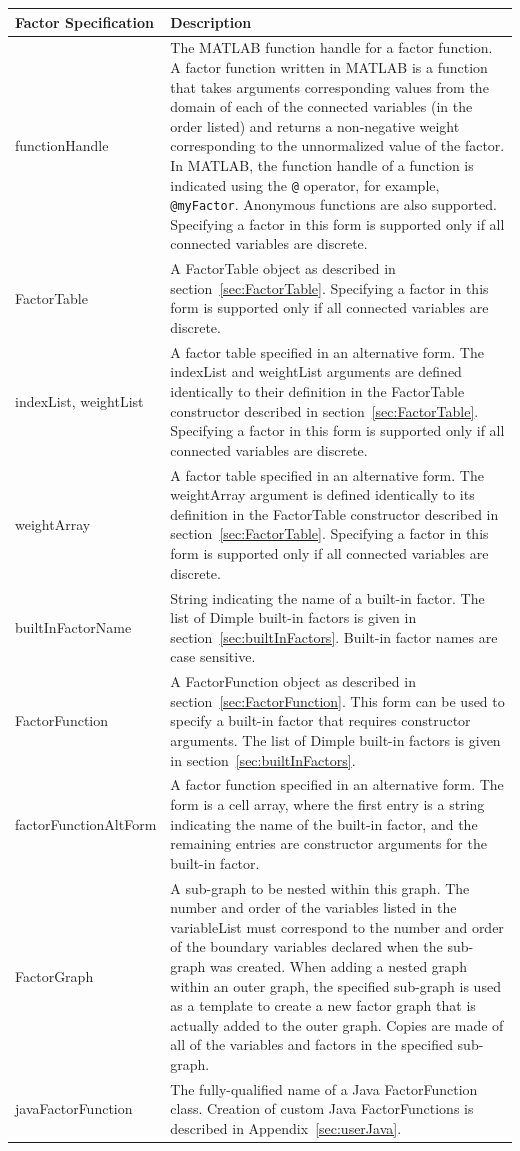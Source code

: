 \ifmatlab
\begin{longtable} {l p{10cm}}
Factor Specification & Description \\
\hline
\endhead
%
functionHandle & The MATLAB function handle for a factor function.  A factor function written in MATLAB is a function that takes arguments corresponding values from the domain of each of the connected variables (in the order listed) and returns a non-negative weight corresponding to the unnormalized value of the factor.  In MATLAB, the function handle of a function is indicated using the \texttt{@} operator, for example, \texttt{@myFactor}.  Anonymous functions are also supported.  Specifying a factor in this form is supported only if all connected variables are discrete.  \\
%
FactorTable & A FactorTable object as described in section~\ref{sec:FactorTable}.  Specifying a factor in this form is supported only if all connected variables are discrete. \\
%
indexList, weightList & A factor table specified in an alternative form.  The indexList and weightList arguments are defined identically to their definition in the FactorTable constructor described in section~\ref{sec:FactorTable}. Specifying a factor in this form is supported only if all connected variables are discrete. \\
%
weightArray & A factor table specified in an alternative form.  The weightArray argument is defined identically to its definition in the FactorTable constructor described in section~\ref{sec:FactorTable}. Specifying a factor in this form is supported only if all connected variables are discrete. \\
%
builtInFactorName & String indicating the name of a built-in factor.  The list of Dimple built-in factors is given in section~\ref{sec:builtInFactors}.  Built-in factor names are case sensitive.  \\
%
FactorFunction & A FactorFunction object as described in section~\ref{sec:FactorFunction}. This form can be used to specify a built-in factor that requires constructor arguments.  The list of Dimple built-in factors is given in section~\ref{sec:builtInFactors}.\\
%
factorFunctionAltForm & A factor function specified in an alternative form.  The form is a cell array, where the first entry is a string indicating the name of the built-in factor, and the remaining entries are constructor arguments for the built-in factor.  \\
%
FactorGraph & A sub-graph to be nested within this graph.  The number and order of the variables listed in the variableList must correspond to the number and order of the boundary variables declared when the sub-graph was created.  When adding a nested graph within an outer graph, the specified sub-graph is used as a template to create a new factor graph that is actually added to the outer graph.  Copies are made of all of the variables and factors in the specified sub-graph. \\
%
javaFactorFunction & The fully-qualified name of a Java FactorFunction class.  Creation of custom Java FactorFunctions is described in Appendix~\ref{sec:userJava}. \\
\end{longtable} 
